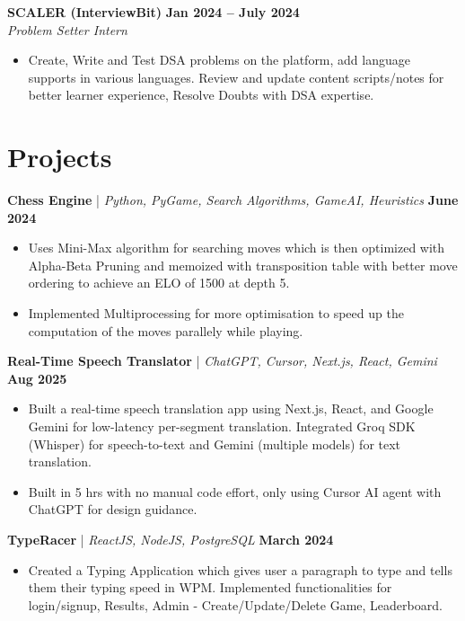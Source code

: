 \documentclass[10pt,a4paper]{article}
\begin{document}
\noindent
\textbf{SCALER (InterviewBit)} \hfill \textbf{Jan 2024 -- July 2024} \\
\textit{Problem Setter Intern}
\vspace{-4pt}
\begin{itemize}[leftmargin=*, noitemsep]
    \item Create, Write and Test DSA problems on the platform, add language supports in various languages. Review and update content scripts/notes for better learner experience, Resolve Doubts with DSA expertise.
\end{itemize}

\section*{Projects}
\noindent
\textbf{Chess Engine} | \textit{Python, PyGame, Search Algorithms, GameAI, Heuristics} \hfill \textbf{June 2024}
\vspace{-4pt}
\begin{itemize}[leftmargin=*, noitemsep]
    \item Uses Mini-Max algorithm for searching moves which is then optimized with Alpha-Beta Pruning and memoized with transposition table with better move ordering to achieve an ELO of 1500 at depth 5.
    \item Implemented Multiprocessing for more optimisation to speed up the computation of the moves parallely while playing.
\end{itemize}
\vspace{4pt}

\noindent
\textbf{Real-Time Speech Translator} | \textit{ChatGPT, Cursor, Next.js, React, Gemini} \hfill \textbf{Aug 2025}
\vspace{-4pt}
\begin{itemize}[leftmargin=*, noitemsep]
    \item Built a real-time speech translation app using Next.js, React, and Google Gemini for low-latency per-segment translation. Integrated Groq SDK (Whisper) for speech-to-text and Gemini (multiple models) for text translation.
    \item Built in 5 hrs with no manual code effort, only using Cursor AI agent with ChatGPT for design guidance.
\end{itemize}
\vspace{4pt}

\noindent
\textbf{TypeRacer} | \textit{ReactJS, NodeJS, PostgreSQL} \hfill \textbf{March 2024}
\vspace{-4pt}
\begin{itemize}[leftmargin=*, noitemsep]
    \item Created a Typing Application which gives user a paragraph to type and tells them their typing speed in WPM. Implemented functionalities for login/signup, Results, Admin - Create/Update/Delete Game, Leaderboard.
\end{itemize}
\end{document}

